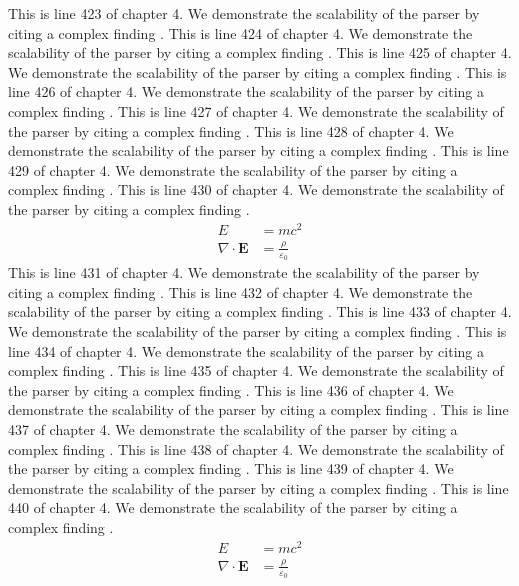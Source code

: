 This is line 423 of chapter 4. We demonstrate the scalability of the parser by citing a complex finding \cite{ref4_423}.
This is line 424 of chapter 4. We demonstrate the scalability of the parser by citing a complex finding \cite{ref4_424}.
This is line 425 of chapter 4. We demonstrate the scalability of the parser by citing a complex finding \cite{ref4_425}.
This is line 426 of chapter 4. We demonstrate the scalability of the parser by citing a complex finding \cite{ref4_426}.
This is line 427 of chapter 4. We demonstrate the scalability of the parser by citing a complex finding \cite{ref4_427}.
This is line 428 of chapter 4. We demonstrate the scalability of the parser by citing a complex finding \cite{ref4_428}.
This is line 429 of chapter 4. We demonstrate the scalability of the parser by citing a complex finding \cite{ref4_429}.
This is line 430 of chapter 4. We demonstrate the scalability of the parser by citing a complex finding \cite{ref4_430}.
\begin{align*}
  E &= mc^2 \\
  \nabla \cdot \mathbf{E} &= \frac{\rho}{\varepsilon_0}
\end{align*}
This is line 431 of chapter 4. We demonstrate the scalability of the parser by citing a complex finding \cite{ref4_431}.
This is line 432 of chapter 4. We demonstrate the scalability of the parser by citing a complex finding \cite{ref4_432}.
This is line 433 of chapter 4. We demonstrate the scalability of the parser by citing a complex finding \cite{ref4_433}.
This is line 434 of chapter 4. We demonstrate the scalability of the parser by citing a complex finding \cite{ref4_434}.
This is line 435 of chapter 4. We demonstrate the scalability of the parser by citing a complex finding \cite{ref4_435}.
This is line 436 of chapter 4. We demonstrate the scalability of the parser by citing a complex finding \cite{ref4_436}.
This is line 437 of chapter 4. We demonstrate the scalability of the parser by citing a complex finding \cite{ref4_437}.
This is line 438 of chapter 4. We demonstrate the scalability of the parser by citing a complex finding \cite{ref4_438}.
This is line 439 of chapter 4. We demonstrate the scalability of the parser by citing a complex finding \cite{ref4_439}.
This is line 440 of chapter 4. We demonstrate the scalability of the parser by citing a complex finding \cite{ref4_440}.
\begin{align*}
  E &= mc^2 \\
  \nabla \cdot \mathbf{E} &= \frac{\rho}{\varepsilon_0}
\end{align*}
